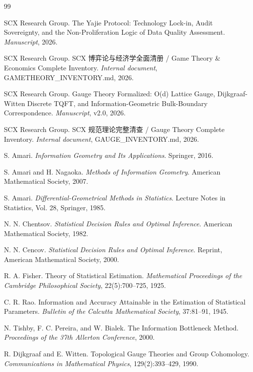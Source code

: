\documentclass[12pt,a4paper]{article}
\theoremstyle{definition}
\theoremstyle{remark}
\begin{document}
\begin{thebibliography}{99}

SCX Research Group.
\newblock The Yajie Protocol: Technology Lock-in, Audit Sovereignty, and the Non-Proliferation Logic of Data Quality Assessment.
\newblock \textit{Manuscript}, 2026.

SCX Research Group.
\newblock SCX 博弈论与经济学全面清册 / Game Theory \& Economics Complete Inventory.
\newblock \textit{Internal document}, GAMETHEORY\_INVENTORY.md, 2026.

SCX Research Group.
\newblock Gauge Theory Formalized: O(d) Lattice Gauge, Dijkgraaf-Witten Discrete TQFT, and Information-Geometric Bulk-Boundary Correspondence.
\newblock \textit{Manuscript}, v2.0, 2026.

SCX Research Group.
\newblock SCX 规范理论完整清查 / Gauge Theory Complete Inventory.
\newblock \textit{Internal document}, GAUGE\_INVENTORY.md, 2026.

S. Amari.
\newblock \textit{Information Geometry and Its Applications}.
\newblock Springer, 2016.

S. Amari and H. Nagaoka.
\newblock \textit{Methods of Information Geometry}.
\newblock American Mathematical Society, 2007.

S. Amari.
\newblock \textit{Differential-Geometrical Methods in Statistics}.
\newblock Lecture Notes in Statistics, Vol. 28, Springer, 1985.

N. N. Chentsov.
\newblock \textit{Statistical Decision Rules and Optimal Inference}.
\newblock American Mathematical Society, 1982.

N. N. Cencov.
\newblock \textit{Statistical Decision Rules and Optimal Inference}.
\newblock Reprint, American Mathematical Society, 2000.

R. A. Fisher.
\newblock Theory of Statistical Estimation.
\newblock \textit{Mathematical Proceedings of the Cambridge Philosophical Society}, 22(5):700--725, 1925.

C. R. Rao.
\newblock Information and Accuracy Attainable in the Estimation of Statistical Parameters.
\newblock \textit{Bulletin of the Calcutta Mathematical Society}, 37:81--91, 1945.

N. Tishby, F. C. Pereira, and W. Bialek.
\newblock The Information Bottleneck Method.
\newblock \textit{Proceedings of the 37th Allerton Conference}, 2000.

R. Dijkgraaf and E. Witten.
\newblock Topological Gauge Theories and Group Cohomology.
\newblock \textit{Communications in Mathematical Physics}, 129(2):393--429, 1990.

\end{thebibliography}
\end{document}

